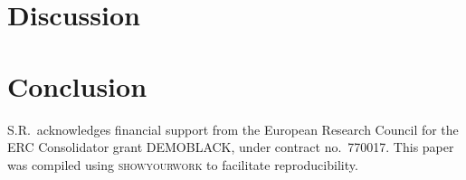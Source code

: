 \documentclass[aps,prd,twocolumn,superscriptaddress,preprintnumbers,nofootinbib,hidelinks]{revtex4-2}
\begin{document}
\section{Discussion}
\label{sec:discussion}

\section{Conclusion}
\label{sec:conclusion}

\begin{acknowledgments}

S.R.~acknowledges financial support from the European Research Council for the ERC Consolidator grant DEMOBLACK, under contract no.~770017.
This paper was compiled using \textsc{showyourwork} \cite{Luger2021} to facilitate reproducibility.

\end{acknowledgments}


\end{document}
